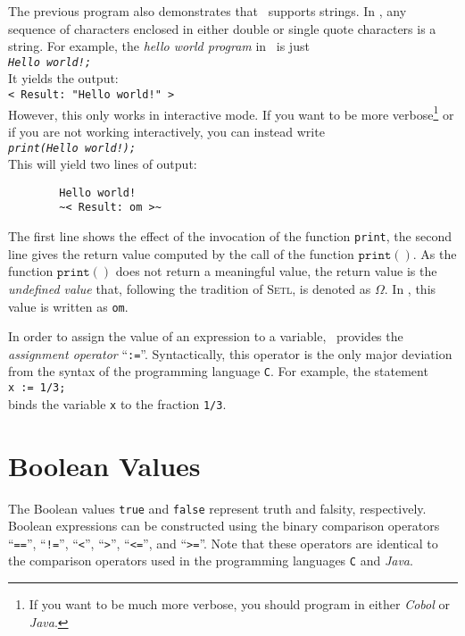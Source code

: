 \noindent
The previous program also demonstrates that \setlx\ supports strings.  In \setlx, any sequence of
characters enclosed in either double or single quote characters is a string.  For example, the 
\emph{hello world program} in \setlx\ is just 
\\[0.2cm]
\hspace*{1.3cm}
\texttt{\textsl{Hello world!;}}
\\[0.2cm]
It yields the output:
\\[0.2cm]
\hspace*{1.3cm}
\texttt{< Result: "Hello world!" >}
\texttt{}
\\[0.2cm]
However, this only works in interactive mode.  If you want to be more verbose\footnote{
If you want to be much more verbose, you should program in either \textsl{Cobol} or \textsl{Java}.
} or if you are not working interactively, you can instead write
\\[0.2cm]
\hspace*{1.3cm}
\texttt{\textsl{print(Hello world!);}}
\\[0.2cm]
This will yield two lines of  output:
\begin{verbatim}
        Hello world!
        ~< Result: om >~
\end{verbatim}
The first line shows the effect of the invocation of the function \texttt{print}, the
second line gives the return value computed by the call of the function $\texttt{print}()$.  As the
function $\texttt{print}()$ does not return a meaningful value, the
return value is the \emph{undefined value} that, following the
tradition of \textsc{Setl}, is denoted as $\Omega$.  In \setlx, this value is written as \texttt{om}.


In order to assign the value of an expression to a variable, \setlx\ provides the 
\emph{assignment operator} ``\texttt{:=}''.  Syntactically, this operator is the only major deviation from the syntax 
of the programming language \texttt{C}. For example, the statement
\\[0.2cm]
\hspace*{1.3cm}
\texttt{x := 1/3;}
\\[0.2cm]
binds the variable \texttt{x} to the fraction \texttt{1/3}.  
\vspace*{0.3cm}


\section{Boolean Values}
The Boolean values \texttt{true} and \texttt{false} represent truth and falsity, respectively.  Boolean
expressions can be constructed using the binary comparison operators ``\texttt{==}'', 
``\texttt{!=}'', ``\texttt{<}'',  ``\texttt{>}'', ``\texttt{<=}'', and ``\texttt{>=}''.
Note that these operators are identical to the comparison operators used in the programming languages
\texttt{C} and \textsl{Java}.

